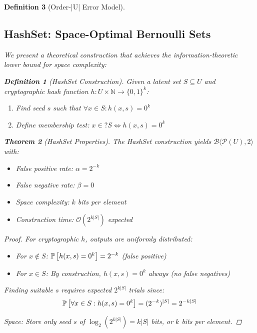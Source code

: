 \documentclass[11pt,final,hidelinks]{article}
\newtheorem{theorem}{Theorem}[section]
\newtheorem{definition}[theorem]{Definition}
\newcommand{\bernoulli}[2]{\mathcal{B}\langle #1, #2 \rangle}
\newcommand{\powerset}[1]{\mathcal{P}(#1)}
\begin{document}
\begin{definition}[Order-|U| Error Model]
\subsection{HashSet: Space-Optimal Bernoulli Sets}

We present a theoretical construction that achieves the information-theoretic lower bound for space complexity:

\begin{definition}[HashSet Construction]
Given a latent set $S \subseteq U$ and cryptographic hash function $h: U \times \mathbb{N} \to \{0,1\}^k$:
\begin{enumerate}
    \item Find seed $s$ such that $\forall x \in S: h(x, s) = 0^k$
    \item Define membership test: $x \in? S \iff h(x, s) = 0^k$
\end{enumerate}
\end{definition}

\begin{theorem}[HashSet Properties]
The HashSet construction yields $\bernoulli{\powerset{U}}{2}$ with:
\begin{itemize}
    \item False positive rate: $\alpha = 2^{-k}$
    \item False negative rate: $\beta = 0$
    \item Space complexity: $k$ bits per element
    \item Construction time: $\mathcal{O}(2^{k|S|})$ expected
\end{itemize}
\end{theorem}

\begin{proof}
For cryptographic $h$, outputs are uniformly distributed:
\begin{itemize}
    \item For $x \notin S$: $\mathbb{P}\left[h(x, s) = 0^k\right] = 2^{-k}$ (false positive)
    \item For $x \in S$: By construction, $h(x, s) = 0^k$ always (no false negatives)
\end{itemize}

Finding suitable $s$ requires expected $2^{k|S|}$ trials since:
\begin{equation}
\mathbb{P}\left[\forall x \in S: h(x, s) = 0^k\right] = (2^{-k})^{|S|} = 2^{-k|S|}
\end{equation}

Space: Store only seed $s$ of $\log_2(2^{k|S|}) = k|S|$ bits, or $k$ bits per element.
\end{proof}


\end{definition}
\end{document}
